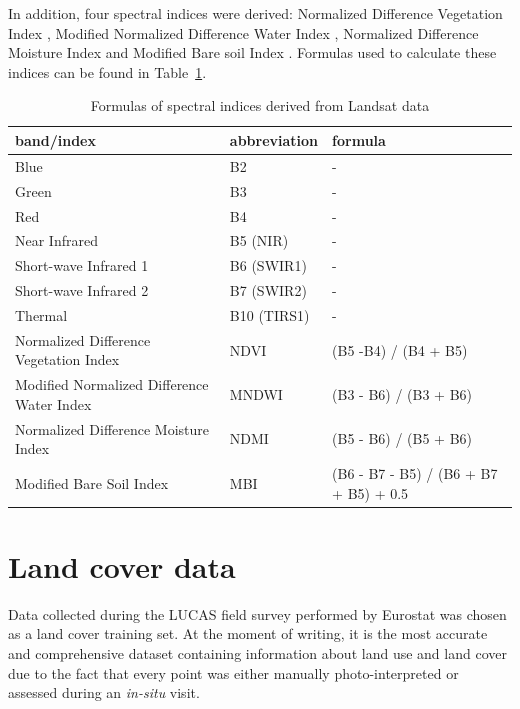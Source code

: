 \documentclass{amuthesis}
\begin{document}
In addition, four spectral indices were derived: Normalized Difference
Vegetation Index \autocite[NDVI:][]{tucker_red_1979}, Modified
Normalized Difference Water Index
\autocite[MNDWI:][]{xu_modification_2006}, Normalized Difference
Moisture Index \autocite[NDMI:][]{jin_comparison_2005} and Modified Bare
soil Index \autocite[MBI:][]{nguyen_modified_2021}. Formulas used to
calculate these indices can be found in Table~\ref{tbl-tabela1}.

\hypertarget{tbl-tabela1}{}
\begin{table}
\caption{\label{tbl-tabela1}Formulas of spectral indices derived from Landsat data }\tabularnewline

\centering
\begin{tabular}{|>{\raggedright\arraybackslash}p{4cm}|>{}l|>{}l|}
\toprule
\textbf{band/index} & \textbf{abbreviation} & \textbf{formula}\\
\midrule
Blue & B2 & -\\
\hline
Green & B3 & -\\
\hline
Red & B4 & -\\
\hline
Near Infrared & B5 (NIR) & -\\
\hline
Short-wave Infrared 1 & B6 (SWIR1) & -\\
\hline
Short-wave Infrared 2 & B7 (SWIR2) & -\\
\hline
Thermal & B10 (TIRS1) & -\\
\hline
Normalized Difference Vegetation Index & NDVI & (B5 -B4) / (B4 + B5)\\
\hline
Modified Normalized Difference Water Index & MNDWI & (B3 - B6) / (B3 + B6)\\
\hline
Normalized Difference Moisture Index & NDMI & (B5 - B6) / (B5 + B6)\\
\hline
Modified Bare Soil Index & MBI & (B6 - B7 - B5) / (B6 + B7 + B5) + 0.5\\
\bottomrule
\end{tabular}
\end{table}

\hypertarget{sec-landcover}{%
\section{Land cover data}\label{sec-landcover}}

Data collected during the LUCAS field survey performed by Eurostat was
chosen as a land cover training set. At the moment of writing, it is the
most accurate and comprehensive dataset containing information about
land use and land cover \autocite{pflugmacher_mapping_2019} due to the
fact that every point was either manually photo-interpreted or assessed
during an \emph{in-situ} visit.
\end{document}
